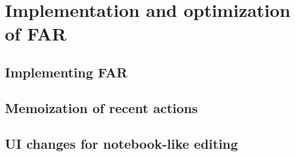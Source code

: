 \section{Implementation and optimization of FAR}
\label{sec:far_impl}

\subsection{Implementing FAR}
\label{sec:implementing_far}

\subsection{Memoization of recent actions} 
\label{sec:memoization_actions}

\subsection{UI changes for notebook-like editing}
\label{sec:notebook_ui}


